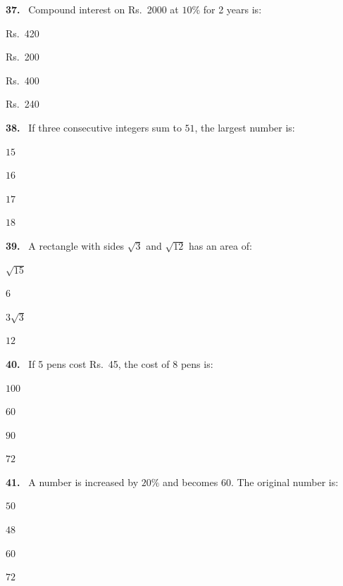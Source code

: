 \documentclass[11pt]{article}
\newenvironment{qenv}[1]{%
  \par\medskip\noindent\textbf{#1.}\ \ignorespaces
}{\par}
\begin{document}
\begin{qenv}{37} Compound interest on Rs.\ 2000 at $10\%$ for 2 years is:
\begin{options} \item Rs.\ 420 \item Rs.\ 200 \item Rs.\ 400 \item Rs.\ 240 \end{options} \end{qenv}

\begin{qenv}{38} If three consecutive integers sum to $51$, the largest number is:
\begin{options} \item $15$ \item $16$ \item $17$ \item $18$ \end{options} \end{qenv}

\begin{qenv}{39} A rectangle with sides $\sqrt{3}$ and $\sqrt{12}$ has an area of:
\begin{options} \item $\sqrt{15}$ \item $6$ \item $3\sqrt{3}$ \item $12$ \end{options} \end{qenv}

\begin{qenv}{40} If 5 pens cost Rs.\ 45, the cost of 8 pens is:
\begin{options} \item $100$ \item $60$ \item $90$ \item $72$ \end{options} \end{qenv}

\begin{qenv}{41} A number is increased by $20\%$ and becomes $60$. The original number is:
\begin{options} \item $50$ \item $48$ \item $60$ \item $72$ \end{options} \end{qenv}
\end{document}
